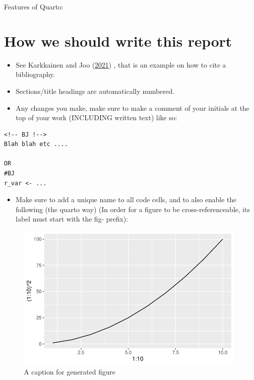 \documentclass[
  letterpaper,
  DIV=11,
  numbers=noendperiod]{scrreprt}
\providecommand{\tightlist}{%
  \setlength{\itemsep}{0pt}\setlength{\parskip}{0pt}}\usepackage{longtable,booktabs,array}
\begin{document}
Features of Quarto:

\hypertarget{how-we-should-write-this-report}{%
\section*{How we should write this
report}\label{how-we-should-write-this-report}}


\begin{itemize}
\tightlist
\item
  See Karkkainen and Joo (\protect\hyperlink{ref-fairface}{2021}) , that
  is an example on how to cite a bibliography.
\item
  Sections/title headings are automatically numbered.
\item
  Any changes you make, make sure to make a comment of your initials at
  the top of your work (INCLUDING written text) like so:
\end{itemize}

\begin{verbatim}
<!-- BJ !-->
Blah blah etc ....

OR
#BJ
r_var <- ...
\end{verbatim}

\begin{itemize}
\tightlist
\item
  Make sure to add a unique name to all code cells, and to also enable
  the following (the quarto way) (In order for a figure to be
  cross-referenceable, its label must start with the fig- prefix):
\end{itemize}

\begin{figure}

{\centering \includegraphics{index_files/figure-pdf/fig-sec1-unique-name-1.pdf}

}

\caption{\label{fig-sec1-unique-name}A caption for generated figure}

\end{figure}
\end{document}
